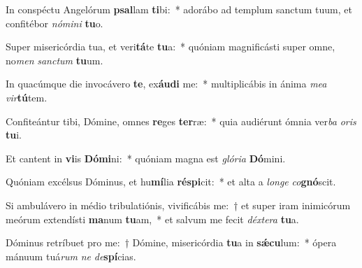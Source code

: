 \item In conspéctu Angelórum \textbf{psal}lam \textbf{ti}bi:~* adorábo ad templum sanctum tuum, et confitébor \textit{nó}\textit{mi}\textit{ni} \textbf{tu}o.
\item Super misericórdia tua, et veri\textbf{tá}te \textbf{tu}a:~* quóniam magnificásti super omne, no\textit{men} \textit{sanc}\textit{tum} \textbf{tu}um.
\item In quacúmque die invocávero \textbf{te}, ex\textbf{áu}\textbf{di} me:~* multiplicábis in ánima \textit{me}\textit{a} \textit{vir}\textbf{tú}tem.
\item Confiteántur tibi, Dómine, omnes \textbf{re}ges \textbf{ter}ræ:~* quia audiérunt ómnia ver\textit{ba} \textit{o}\textit{ris} \textbf{tu}i.
\item Et cantent in \textbf{vi}is \textbf{Dó}\textbf{mi}ni:~* quóniam magna est \textit{gló}\textit{ri}\textit{a} \textbf{Dó}mini.
\item Quóniam excélsus Dóminus, et hu\textbf{mí}lia \textbf{ré}\textbf{spi}cit:~* et alta a \textit{lon}\textit{ge} \textit{co}\textbf{gnó}scit.
\item Si ambulávero in médio tribulatiónis, vivificábis me:~† et super iram inimicórum meórum extendísti \textbf{ma}num \textbf{tu}am,~* et salvum me fecit \textit{déx}\textit{te}\textit{ra} \textbf{tu}a.
\item Dóminus retríbuet pro me:~† Dómine, misericórdia \textbf{tu}a in \textbf{sǽ}\textbf{cu}lum:~* ópera mánuum tuá\textit{rum} \textit{ne} \textit{de}\textbf{spí}cias.
